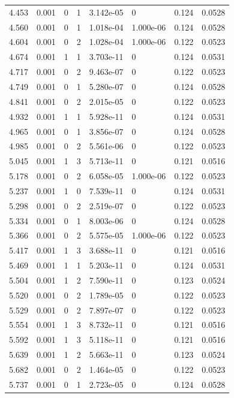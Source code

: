 \documentclass[preview]{standalone}
\begin{document}
{{{\begin{tabular}{L{1.2cm}C{1.2cm} C{0.3cm}C{0.5cm} C{1.4cm}C{1.4cm} C{1.4cm}C{1.4cm}}
  4.453  &  0.001  & 0     &  1 &  3.142e-05  & 0  & 0.124 &  0.0528   \\ 
  4.560  &  0.001  & 0     &  1 &  1.018e-04  & 1.000e-06  & 0.124 &  0.0528   \\ 
  4.604  &  0.001  & 0     &  2 &  1.028e-04  & 1.000e-06  & 0.122 &  0.0523   \\ 
  4.674  &  0.001  & 1     &  1 &  3.703e-11  & 0  & 0.124 &  0.0531   \\ 
  4.717  &  0.001  & 0     &  2 &  9.463e-07  & 0  & 0.122 &  0.0523   \\ 
  4.749  &  0.001  & 0     &  1 &  5.280e-07  & 0  & 0.124 &  0.0528   \\ 
  4.841  &  0.001  & 0     &  2 &  2.015e-05  & 0  & 0.122 &  0.0523   \\ 
  4.932  &  0.001  & 1     &  1 &  5.928e-11  & 0  & 0.124 &  0.0531   \\ 
  4.965  &  0.001  & 0     &  1 &  3.856e-07  & 0  & 0.124 &  0.0528   \\ 
  4.985  &  0.001  & 0     &  2 &  5.561e-06  & 0  & 0.122 &  0.0523   \\ 
  5.045  &  0.001  & 1     &  3 &  5.713e-11  & 0  & 0.121 &  0.0516   \\ 
  5.178  &  0.001  & 0     &  2 &  6.058e-05  & 1.000e-06  & 0.122 &  0.0523   \\ 
  5.237  &  0.001  & 1     &  0 &  7.539e-11  & 0  & 0.124 &  0.0531   \\ 
  5.298  &  0.001  & 0     &  2 &  2.519e-07  & 0  & 0.122 &  0.0523   \\ 
  5.334  &  0.001  & 0     &  1 &  8.003e-06  & 0  & 0.124 &  0.0528   \\ 
  5.366  &  0.001  & 0     &  2 &  5.575e-05  & 1.000e-06  & 0.122 &  0.0523   \\ 
  5.417  &  0.001  & 1     &  3 &  3.688e-11  & 0  & 0.121 &  0.0516   \\ 
  5.469  &  0.001  & 1     &  1 &  5.203e-11  & 0  & 0.124 &  0.0531   \\ 
  5.504  &  0.001  & 1     &  2 &  7.590e-11  & 0  & 0.123 &  0.0524   \\ 
  5.520  &  0.001  & 0     &  2 &  1.789e-05  & 0  & 0.122 &  0.0523   \\ 
  5.529  &  0.001  & 0     &  2 &  7.897e-07  & 0  & 0.122 &  0.0523   \\ 
  5.554  &  0.001  & 1     &  3 &  8.732e-11  & 0  & 0.121 &  0.0516   \\ 
  5.592  &  0.001  & 1     &  3 &  5.118e-11  & 0  & 0.121 &  0.0516   \\ 
  5.639  &  0.001  & 1     &  2 &  5.663e-11  & 0  & 0.123 &  0.0524   \\ 
  5.682  &  0.001  & 0     &  2 &  1.464e-05  & 0  & 0.122 &  0.0523   \\ 
  5.737  &  0.001  & 0     &  1 &  2.723e-05  & 0  & 0.124 &  0.0528   \\ 
\hline 
\end{tabular} 

}}}
\end{document}
